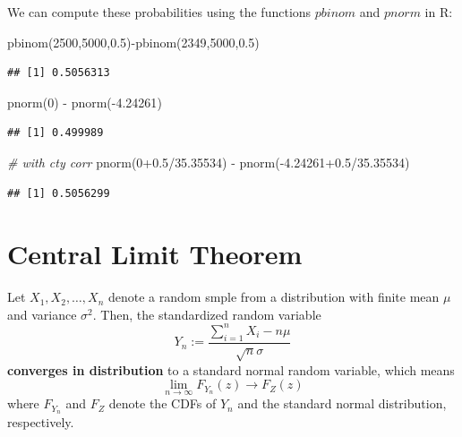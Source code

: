 \documentclass[
]{book}
\newenvironment{Shaded}{\begin{snugshade}}{\end{snugshade}}
\newcommand{\CommentTok}[1]{\textcolor[rgb]{0.56,0.35,0.01}{\textit{#1}}}
\newcommand{\DecValTok}[1]{\textcolor[rgb]{0.00,0.00,0.81}{#1}}
\newcommand{\FloatTok}[1]{\textcolor[rgb]{0.00,0.00,0.81}{#1}}
\newcommand{\FunctionTok}[1]{\textcolor[rgb]{0.00,0.00,0.00}{#1}}
\newcommand{\NormalTok}[1]{#1}
\newcommand{\SpecialCharTok}[1]{\textcolor[rgb]{0.00,0.00,0.00}{#1}}
\begin{document}
We can compute these probabilities using the functions \(pbinom\) and \(pnorm\) in R:

\begin{Shaded}
\begin{Highlighting}[]
\FunctionTok{pbinom}\NormalTok{(}\DecValTok{2500}\NormalTok{,}\DecValTok{5000}\NormalTok{,}\FloatTok{0.5}\NormalTok{)}\SpecialCharTok{{-}}\FunctionTok{pbinom}\NormalTok{(}\DecValTok{2349}\NormalTok{,}\DecValTok{5000}\NormalTok{,}\FloatTok{0.5}\NormalTok{)}
\end{Highlighting}
\end{Shaded}

\begin{verbatim}
## [1] 0.5056313
\end{verbatim}

\begin{Shaded}
\begin{Highlighting}[]
\FunctionTok{pnorm}\NormalTok{(}\DecValTok{0}\NormalTok{) }\SpecialCharTok{{-}} \FunctionTok{pnorm}\NormalTok{(}\SpecialCharTok{{-}}\FloatTok{4.24261}\NormalTok{)}
\end{Highlighting}
\end{Shaded}

\begin{verbatim}
## [1] 0.499989
\end{verbatim}

\begin{Shaded}
\begin{Highlighting}[]
\CommentTok{\# with cty corr}
\FunctionTok{pnorm}\NormalTok{(}\DecValTok{0}\FloatTok{+0.5}\SpecialCharTok{/}\FloatTok{35.35534}\NormalTok{) }\SpecialCharTok{{-}} \FunctionTok{pnorm}\NormalTok{(}\SpecialCharTok{{-}}\FloatTok{4.24261+0.5}\SpecialCharTok{/}\FloatTok{35.35534}\NormalTok{)}
\end{Highlighting}
\end{Shaded}

\begin{verbatim}
## [1] 0.5056299
\end{verbatim}

\hypertarget{central-limit-theorem}{%
\chapter{Central Limit Theorem}\label{central-limit-theorem}}

Let \(X_1, X_2, \ldots, X_n\) denote a random smple from a distribution with finite mean \(\mu\) and variance \(\sigma^2\). Then, the standardized random variable
\[Y_n := \frac{\sum_{i=1}^n X_i - n\mu}{\sqrt{n}\sigma}\]
\textbf{converges in distribution} to a standard normal random variable, which means
\[\lim_{n\rightarrow \infty}F_{Y_n}(z) \rightarrow F_Z(z)\]
where \(F_{Y_n}\) and \(F_Z\) denote the CDFs of \(Y_n\) and the standard normal distribution, respectively.
\end{document}

